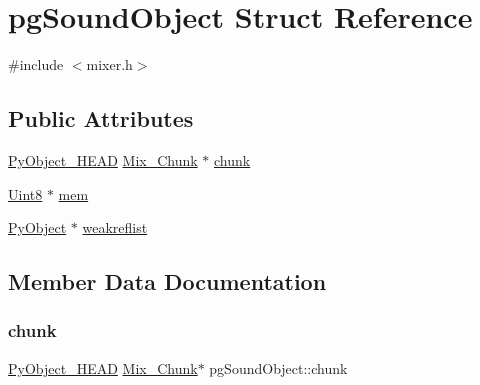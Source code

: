 \hypertarget{structpg_sound_object}{}\section{pg\+Sound\+Object Struct Reference}
\label{structpg_sound_object}


{\ttfamily \#include $<$mixer.\+h$>$}

\subsection*{Public Attributes}
\begin{DoxyCompactItemize}
\item 
\mbox{\hyperlink{_python27_2object_8h_a0bf35c1f3ea13f925de94d8593db3b7e}{Py\+Object\+\_\+\+H\+E\+AD}} \mbox{\hyperlink{struct_mix___chunk}{Mix\+\_\+\+Chunk}} $\ast$ \mbox{\hyperlink{structpg_sound_object_aa50c0643b71d263786b65f8053a1987d}{chunk}}
\item 
\mbox{\hyperlink{_s_d_l__stdinc_8h_a2944638813a090aa23e62f4da842c3e2}{Uint8}} $\ast$ \mbox{\hyperlink{structpg_sound_object_a443b646070c769b75daa6c692b652ce9}{mem}}
\item 
\mbox{\hyperlink{_python27_2object_8h_aadc84ac7aed2cfa6f20c25f62bf3dac7}{Py\+Object}} $\ast$ \mbox{\hyperlink{structpg_sound_object_a6a3af76d431e428d0132c6733b2d9057}{weakreflist}}
\end{DoxyCompactItemize}


\subsection{Member Data Documentation}
\mbox{\label{structpg_sound_object_aa50c0643b71d263786b65f8053a1987d}} 
\subsubsection{\texorpdfstring{chunk}{chunk}}
{\footnotesize\ttfamily \mbox{\hyperlink{_python27_2object_8h_a0bf35c1f3ea13f925de94d8593db3b7e}{Py\+Object\+\_\+\+H\+E\+AD}} \mbox{\hyperlink{struct_mix___chunk}{Mix\+\_\+\+Chunk}}$\ast$ pg\+Sound\+Object\+::chunk}

\mbox{\label{structpg_sound_object_a443b646070c769b75daa6c692b652ce9}} 
